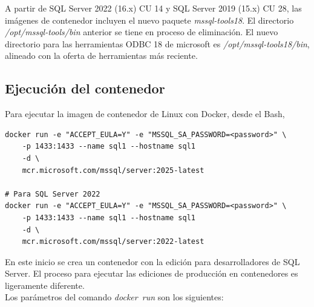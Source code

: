     A partir de SQL Server 2022 (16.x) CU 14 y SQL Server 2019 (15.x) CU 28, las imágenes de contenedor incluyen el nuevo paquete \textit{mssql-tools18}. El directorio \textit{/opt/mssql-tools/bin} anterior se tiene en proceso de eliminación. El nuevo directorio para las herramientas ODBC 18 de microsoft es \textit{/opt/mssql-tools18/bin}, alineado con la oferta de herramientas más reciente.

    \subsection{Ejecución del contenedor}
    Para ejecutar la imagen de contenedor de Linux con Docker, desde el Bash,
\begin{lstlisting}
docker run -e "ACCEPT_EULA=Y" -e "MSSQL_SA_PASSWORD=<password>" \
    -p 1433:1433 --name sql1 --hostname sql1
    -d \
    mcr.microsoft.com/mssql/server:2025-latest

# Para SQL Server 2022
docker run -e "ACCEPT_EULA=Y" -e "MSSQL_SA_PASSWORD=<password>" \
    -p 1433:1433 --name sql1 --hostname sql1
    -d \
    mcr.microsoft.com/mssql/server:2022-latest
\end{lstlisting}
    En este inicio se crea un contenedor con la edición para desarrolladores de SQL Server. El proceso para ejecutar las ediciones de producción en contenedores es ligeramente diferente.\\Los parámetros del comando \textit{docker\ run} son los siguientes:

